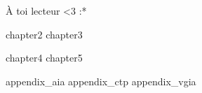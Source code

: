 \documentclass{these-ISSS} %
\begin{document}

  

  \maketitle

  \begin{dedicace}
    À toi lecteur <3 :*
  \end{dedicace}

  \cleardoublepage

  

  

  \tableofcontents

  \mainmatter

  

  {chapter2}
  {chapter3}

  {chapter4}
  {chapter5}


  \backmatter

  \renewcommand{\bibtitle}{\bibchapter}
  
  

  \renewcommand{\bibtitle}{\section*{\refname}}

  \listoffigures

  \renewcommand{\listtheoremname}{Liste des définitions}
  \listoftheorems[ignoreall,show={definition}]

  \renewcommand{\listtheoremname}{Liste des exemples}
  \listoftheorems[ignoreall,show={example}]

  \listofalgorithms


  \appendix
  {appendix_aia}
  {appendix_ctp}
  {appendix_vgia}
\end{document}
